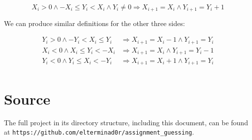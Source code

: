 \documentclass{article}
\begin{document}
    \begin{equation}
      X_i > 0 \wedge
      -X_i \leq Y_i < X_i \wedge
      Y_i \neq 0
    \Rightarrow
      X_{i + 1} = X_i \wedge
      Y_{i + 1} = Y_i + 1
    \end{equation}

    We can produce similar definitions for the other three sides:

    \begin{align*}
      Y_i > 0 \wedge
      -Y_i < X_i \leq Y_i
    & \Rightarrow
      X_{i + 1} = X_i - 1 \wedge
      Y_{i + 1} = Y_i\\
      X_i < 0 \wedge
      X_i \leq Y_i < -X_i
    & \Rightarrow
      X_{i + 1} = X_i \wedge
      Y_{i + 1} = Y_i - 1\\
      Y_i < 0 \wedge
      Y_i \leq X_i < -Y_i
    & \Rightarrow
      X_{i + 1} = X_i + 1 \wedge
      Y_{i + 1} = Y_i\\
    \end{align*}

    \section{Source}
    The full project in its directory structure, including this document, can
    be found at \verb|https://github.com/elterminad0r/assignment_guessing|.
\end{document}
